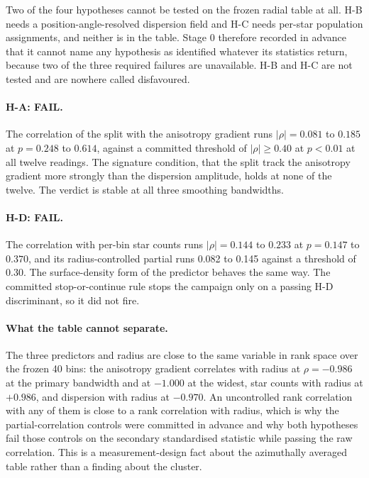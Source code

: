 \documentclass[11pt]{article}
\begin{document}
Two of the four hypotheses cannot be tested on the frozen radial table at all. H-B needs a position-angle-resolved dispersion field and H-C needs per-star population assignments, and neither is in the table. Stage 0 therefore recorded in advance that it cannot name any hypothesis as identified whatever its statistics return, because two of the three required failures are unavailable. H-B and H-C are not tested and are nowhere called disfavoured.

\paragraph{H-A: FAIL.} The correlation of the split with the anisotropy gradient runs $|\rho| = 0.081$ to $0.185$ at $p = 0.248$ to $0.614$, against a committed threshold of $|\rho| \geq 0.40$ at $p < 0.01$ at all twelve readings. The signature condition, that the split track the anisotropy gradient more strongly than the dispersion amplitude, holds at none of the twelve. The verdict is stable at all three smoothing bandwidths.

\paragraph{H-D: FAIL.} The correlation with per-bin star counts runs $|\rho| = 0.144$ to $0.233$ at $p = 0.147$ to $0.370$, and its radius-controlled partial runs 0.082 to 0.145 against a threshold of 0.30. The surface-density form of the predictor behaves the same way. The committed stop-or-continue rule stops the campaign only on a passing H-D discriminant, so it did not fire.

\paragraph{What the table cannot separate.} The three predictors and radius are close to the same variable in rank space over the frozen 40 bins: the anisotropy gradient correlates with radius at $\rho = -0.986$ at the primary bandwidth and at $-1.000$ at the widest, star counts with radius at $+0.986$, and dispersion with radius at $-0.970$. An uncontrolled rank correlation with any of them is close to a rank correlation with radius, which is why the partial-correlation controls were committed in advance and why both hypotheses fail those controls on the secondary standardised statistic while passing the raw correlation. This is a measurement-design fact about the azimuthally averaged table rather than a finding about the cluster.
\end{document}

